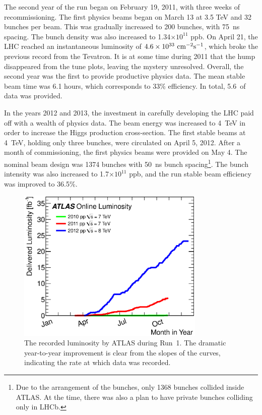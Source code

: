 The second year of the run began on February 19, 2011, with three weeks of recommissioning.
The first physics beams began on March 13 at 3.5 TeV and 32 bunches per beam.
This was gradually increased to 200 bunches, with 75~ns spacing.
The bunch density was also increased to 1.34$\times10^{11}$ ppb.
On April 21, the LHC reached an instantaneous luminosity of $4.6\times10^{33}~\text{cm}^{-2}\text{s}^{-1}$, which broke the previous record from the Tevatron.
It is at some time during 2011 that the hump disappeared from the tune plots, leaving the mystery unresolved.
Overall, the second year was the first to provide productive physics data. The mean stable beam time was 6.1 hours, which corresponds to 33\% efficiency.
In total, 5.6~\fb of data was provided. \cite{lhcRun1}

In the years 2012 and 2013, the investment in carefully developing the LHC paid off with a wealth of physics data.
The beam energy was increased to 4~TeV in order to increase the Higgs production cross-section.
The first stable beams at 4~TeV, holding only three bunches, were circulated on April 5, 2012.
After a month of commissioning, the first physics beams were provided on May 4.
The nominal beam design was 1374 bunches with 50~ns bunch spacing\footnote{Due to the arrangement of the bunches, only 1368 bunches collided inside ATLAS. At the time, there was also a plan to have private bunches colliding only in LHCb.}.
The bunch intensity was also increased to 1.7$\times10^{11}$ ppb, and the run stable beam efficiency was improved to 36.5\%.

\begin{figure}[h!]
\captionsetup[subfigure]{position=b}
\centering
\includegraphics[width=0.8\textwidth]{figures/experiment/lhc/run1Lumi.eps}
\caption{The recorded luminosity by ATLAS during Run~1. The dramatic year-to-year improvement is clear from the slopes of the curves, indicating the rate at which data was recorded.}
\label{fig:run1Lumi}
\end{figure}

